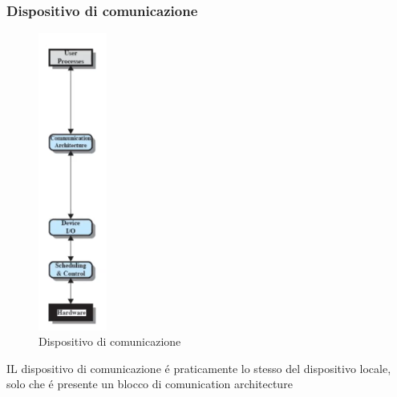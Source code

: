 \subsubsection*{Dispositivo di comunicazione}
\begin{figure}[H]
    \centering
    \includegraphics[width=0.2\textwidth]{immagini/Dispositivo di comunicazione}
    \caption{Dispositivo di comunicazione}
\end{figure}
IL dispositivo di comunicazione é praticamente lo stesso del dispositivo locale, solo che é presente un blocco di comunication architecture
